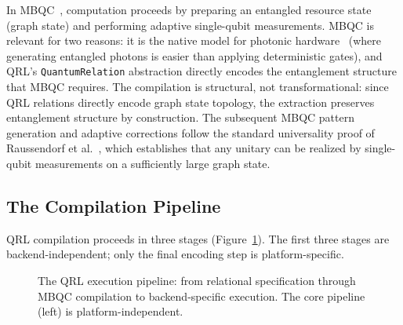 \documentclass[submission,copyright,creativecommons]{eptcs}
\newcommand{\qrl}{\textsc{QRL}}
\newcommand{\mbqc}{\textsc{MBQC}}
\begin{document}
In \mbqc{}~\cite{raussendorf2001,raussendorf2003}, computation proceeds by
preparing an entangled resource state (graph state) and performing adaptive
single-qubit measurements. \mbqc{} is relevant for two reasons: it is the
native model for photonic hardware~\cite{rudolph2017} (where generating
entangled photons is easier than applying deterministic gates), and \qrl{}'s
\texttt{QuantumRelation} abstraction directly encodes the entanglement
structure that \mbqc{} requires. The compilation is structural, not
transformational: since \qrl{} relations directly encode graph state
topology, the extraction preserves entanglement structure by
construction. The subsequent \mbqc{} pattern generation and adaptive
corrections follow the standard universality proof of
Raussendorf et al.~\cite{raussendorf2003}, which establishes that any
unitary can be realized by single-qubit measurements on a sufficiently
large graph state.

\subsection{The Compilation Pipeline}

\qrl{} compilation proceeds in three stages (Figure~\ref{fig:pipeline}).
The first three stages are backend-independent; only the final encoding
step is platform-specific.

\begin{figure}[ht]
\centering
{}
\caption{The \qrl{} execution pipeline: from relational specification
through \mbqc{} compilation to backend-specific execution. The core
pipeline (left) is platform-independent.}
\label{fig:pipeline}
\end{figure}
\end{document}
